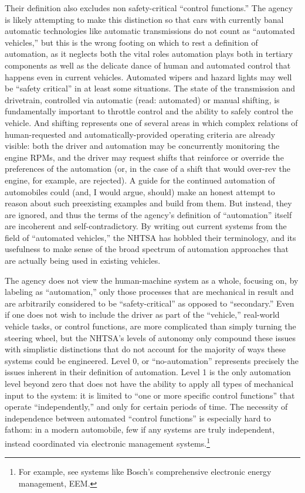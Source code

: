 Their definition also excludes non safety-critical ``control
functions.'' The agency is likely attempting to make this distinction
so that cars with currently banal automatic technologies like
automatic transmissions do 
not count as ``automated vehicles,'' but this is the wrong footing on
which to rest a definition of automation, as it neglects both the
vital roles automation plays both in tertiary components as well as
the delicate dance of human and automated control that happens even in
current vehicles. Automated wipers and hazard
lights may well be ``safety critical'' in at least some situations.
The state of the transmission 
and drivetrain, controlled via automatic (read: automated) or manual
shifting, is fundamentally important to throttle control and the
ability to safely control the vehicle. And shifting represents one of
several areas
in which complex relations of human-requested and
automatically-provided operating criteria are already visible: both
the driver and automation may be concurrently monitoring the engine
RPMs, and the driver may request shifts that reinforce or override the
preferences of the automation (or, in the case of a shift that would
over-rev the engine, for example, are rejected). A guide for the
continued automation of automobiles could (and, I would argue, should)
make an honest attempt to reason about such preexisting examples and
build from them. But instead, they are ignored, and thus the
terms of the agency's definition of ``automation'' itself are incoherent
and self-contradictory. By writing out current systems from the field
of ``automated vehicles,'' the NHTSA has hobbled their terminology,
and its usefulness to make sense of the broad spectrum of automation
approaches that are actually being used in existing vehicles.

The agency does not view the human-machine system as a whole, focusing
on, by labeling as ``automation,'' only those processes that are
mechanical in result and are arbitrarily considered to be
``safety-critical'' as opposed to ``secondary.'' Even if one does not
wish to include 
the driver as part of the ``vehicle,'' real-world vehicle tasks, or
control functions, are more complicated than simply turning the
steering wheel, but the NHTSA's levels of autonomy only compound these
issues with simplistic distinctions that do not account for the
majority of ways these systems could be engineered. Level 0, or
``no-automation'' represents 
precisely the issues inherent in their definition of automation. Level
1 is the only automation level beyond zero that does not have the
ability to apply all types of mechanical input to the system: it is
limited to ``one or more specific control functions'' that operate
``independently,'' and only for certain periods of time.\cite[p. 4]{NHTSA} The
necessity of independence between automated ``control functions'' is
especially hard to fathom: in a modern automobile, few if any systems
are truly independent, instead coordinated via electronic management
systems.\footnote{For example, see systems like Bosch's comprehensive
  electronic energy management, EEM.} 

